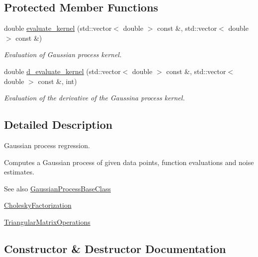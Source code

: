 \subsection*{Protected Member Functions}
\begin{DoxyCompactItemize}
\item 
double \hyperlink{class_gaussian_process_ae7e6f49032c56d31f75c60f7d67f2444}{evaluate\+\_\+kernel} (std\+::vector$<$ double $>$ const \&, std\+::vector$<$ double $>$ const \&)
\begin{DoxyCompactList}\small\item\em Evaluation of Gaussian process kernel. \end{DoxyCompactList}\item 
double \hyperlink{class_gaussian_process_ae182a1b982c557ef60df37b45408945f}{d\+\_\+evaluate\+\_\+kernel} (std\+::vector$<$ double $>$ const \&, std\+::vector$<$ double $>$ const \&, int)\hypertarget{class_gaussian_process_ae182a1b982c557ef60df37b45408945f}{}\label{class_gaussian_process_ae182a1b982c557ef60df37b45408945f}

\begin{DoxyCompactList}\small\item\em Evaluation of the derivative of the Gaussina process kernel. \end{DoxyCompactList}\end{DoxyCompactItemize}


\subsection{Detailed Description}
Gaussian process regression. 

Computes a Gaussian process of given data points, function evaluations and noise estimates. \begin{DoxySeeAlso}{See also}
\hyperlink{class_gaussian_process_base_class}{Gaussian\+Process\+Base\+Class} 

\hyperlink{class_cholesky_factorization}{Cholesky\+Factorization} 

\hyperlink{class_triangular_matrix_operations}{Triangular\+Matrix\+Operations} 
\end{DoxySeeAlso}


\subsection{Constructor \& Destructor Documentation}
